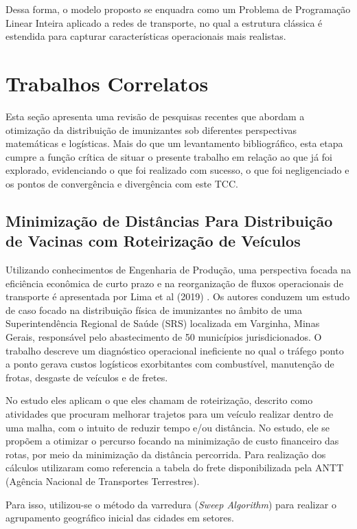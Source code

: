 Dessa forma, o modelo proposto se enquadra como um Problema de Programação Linear Inteira aplicado a redes de transporte, no qual a estrutura clássica é estendida para capturar características operacionais mais realistas.

\section{Trabalhos Correlatos}

Esta seção apresenta uma revisão de pesquisas recentes que abordam a otimização da distribuição de imunizantes sob diferentes perspectivas matemáticas e logísticas. Mais do que um levantamento bibliográfico, esta etapa cumpre a função crítica de situar o presente trabalho em relação ao que já foi explorado, evidenciando o que foi realizado com sucesso, o que foi negligenciado e os pontos de convergência e divergência com este TCC.

\subsection{Minimização de Distâncias Para Distribuição de Vacinas com Roteirização de Veículos}

Utilizando conhecimentos de Engenharia de Produção, uma perspectiva focada na eficiência econômica de curto prazo e na reorganização de fluxos operacionais de transporte é apresentada por Lima et al (2019) \cite{LimaEtAl:2019}. Os autores conduzem um estudo de caso focado na distribuição física de imunizantes no âmbito de uma Superintendência Regional de Saúde (SRS) localizada em Varginha, Minas Gerais, responsável pelo abastecimento de 50 municípios jurisdicionados. O trabalho descreve um diagnóstico operacional ineficiente no qual o tráfego ponto a ponto gerava custos logísticos exorbitantes com combustível, manutenção de frotas, desgaste de veículos e de fretes.

No estudo eles aplicam o que eles chamam de roteirização, descrito como atividades que procuram melhorar trajetos para um veículo realizar dentro de uma malha, com o intuito de reduzir tempo e/ou distância. No estudo, ele se propõem a otimizar o percurso focando na minimização de custo financeiro das rotas, por meio da minimização da distância percorrida. Para realização dos cálculos utilizaram como referencia a tabela do frete disponibilizada pela ANTT (Agência Nacional de Transportes Terrestres).

Para isso, utilizou-se o método da varredura (\textit{Sweep Algorithm}) para realizar o agrupamento geográfico inicial das cidades em setores.

